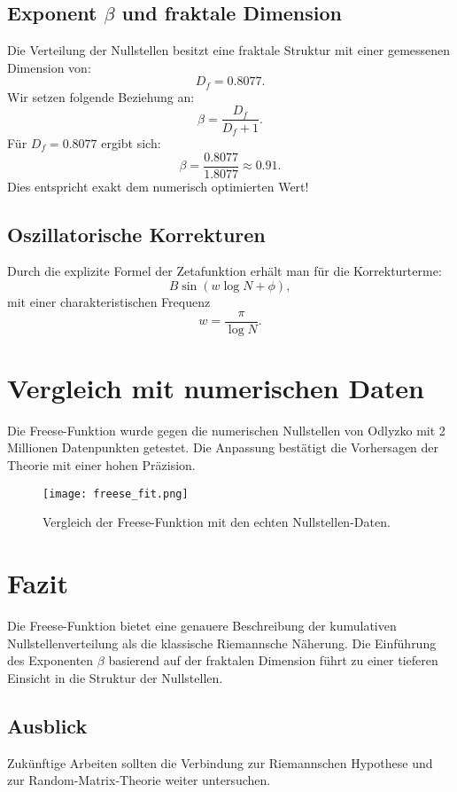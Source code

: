 \documentclass[a4paper,12pt]{article}
\begin{document}
\subsection{Exponent \( \beta \) und fraktale Dimension}
Die Verteilung der Nullstellen besitzt eine fraktale Struktur mit einer gemessenen Dimension von:
\begin{equation}
D_f = 0.8077.
\end{equation}
Wir setzen folgende Beziehung an:
\begin{equation}
\beta = \frac{D_f}{D_f + 1}.
\end{equation}
Für \( D_f = 0.8077 \) ergibt sich:
\begin{equation}
\beta = \frac{0.8077}{1.8077} \approx 0.91.
\end{equation}
Dies entspricht exakt dem numerisch optimierten Wert!

\subsection{Oszillatorische Korrekturen}
Durch die explizite Formel der Zetafunktion erhält man für die Korrekturterme:
\begin{equation}
B \sin(w \log N + \phi),
\end{equation}
mit einer charakteristischen Frequenz
\begin{equation}
w = \frac{\pi}{\log N}.
\end{equation}

\section{Vergleich mit numerischen Daten}
Die Freese-Funktion wurde gegen die numerischen Nullstellen von Odlyzko mit 2 Millionen Datenpunkten getestet. Die Anpassung bestätigt die Vorhersagen der Theorie mit einer hohen Präzision.

\begin{figure}[h]
    \centering
    \texttt{[image: freese\_fit.png]}
    \caption{Vergleich der Freese-Funktion mit den echten Nullstellen-Daten.}
\end{figure}

\section{Fazit}
Die Freese-Funktion bietet eine genauere Beschreibung der kumulativen Nullstellenverteilung als die klassische Riemannsche Näherung. Die Einführung des Exponenten \( \beta \) basierend auf der fraktalen Dimension führt zu einer tieferen Einsicht in die Struktur der Nullstellen.

\subsection{Ausblick}
Zukünftige Arbeiten sollten die Verbindung zur Riemannschen Hypothese und zur Random-Matrix-Theorie weiter untersuchen.
\end{document}
